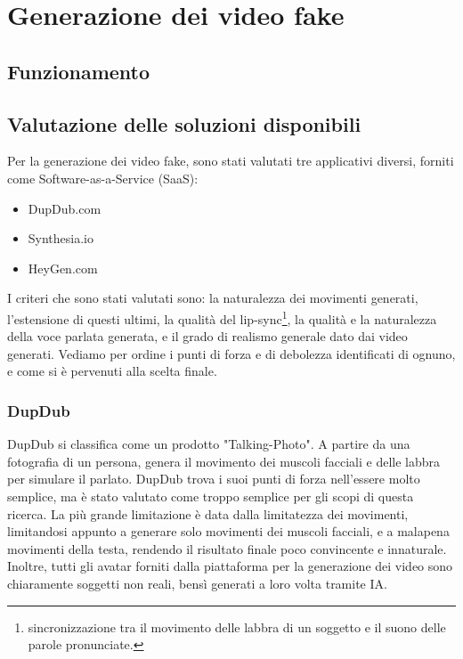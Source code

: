 \chapter{Generazione dei video fake}

\section{Funzionamento}
\label{sec:funzionamento}

\section{Valutazione delle soluzioni disponibili}

Per la generazione dei video fake, sono stati valutati tre applicativi diversi, forniti come Software-as-a-Service (SaaS):
\begin{itemize}
    \item DupDub.com
    \item Synthesia.io
    \item HeyGen.com
\end{itemize}

I criteri che sono stati valutati sono: la naturalezza dei movimenti generati, l'estensione di questi ultimi, la qualità del lip-sync\footnote{sincronizzazione tra il movimento delle labbra di un soggetto e il suono delle parole pronunciate.}, la qualità e la naturalezza della voce parlata generata, e il grado di realismo generale dato dai video generati. Vediamo per ordine i punti di forza e di debolezza identificati di ognuno, e come si è pervenuti alla scelta finale. 

\subsection{DupDub}

DupDub si classifica come un prodotto "Talking-Photo". A partire da una fotografia di un persona, genera il movimento dei muscoli facciali e delle labbra per simulare il parlato. DupDub trova i suoi punti di forza nell'essere molto semplice, ma è stato valutato come troppo semplice per gli scopi di questa ricerca. La più grande limitazione è data dalla limitatezza dei movimenti, limitandosi appunto a generare solo movimenti dei muscoli facciali, e a malapena movimenti della testa, rendendo il risultato finale poco convincente e innaturale. Inoltre, tutti gli avatar forniti dalla piattaforma per la generazione dei video sono chiaramente soggetti non reali, bensì generati a loro volta tramite IA.


